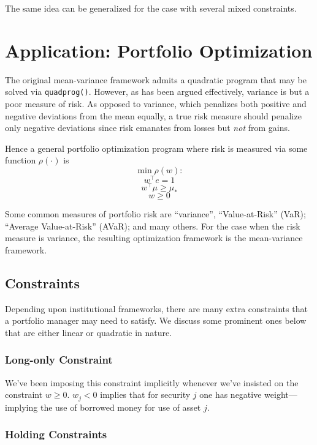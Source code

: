 \documentclass[11pt,]{article}
\begin{document}
The same idea can be generalized for the case with several mixed
constraints.

\section{Application: Portfolio
Optimization}\label{application-portfolio-optimization}

The original mean-variance framework admits a quadratic program that may
be solved via \texttt{quadprog()}. However, as has been argued
effectively, variance is but a poor measure of risk. As opposed to
variance, which penalizes both positive and negative deviations from the
mean equally, a true risk measure should penalize only negative
deviations since risk emanates from losses but \emph{not} from gains.

Hence a general portfolio optimization program where risk is measured
via some function \(\rho(\cdot)\) is \[\min{} \rho(w):\] \[w^{\top}e=1\]
\[w^{\top}\mu \geq \mu_*\] \[w\geq 0\]

Some common measures of portfolio risk are ``variance'',
``Value-at-Risk'' (VaR); ``Average Value-at-Risk'' (AVaR); and many
others. For the case when the risk measure is variance, the resulting
optimization framework is the mean-variance framework.

\subsection{Constraints}\label{constraints}

Depending upon institutional frameworks, there are many extra
constraints that a portfolio manager may need to satisfy. We discuss
some prominent ones below that are either linear or quadratic in nature.

\subsubsection{Long-only Constraint}\label{long-only-constraint}

We've been imposing this constraint implicitly whenever we've insisted
on the constraint \(w\geq 0\). \(w_j<0\) implies that for security \(j\)
one has negative weight---implying the use of borrowed money for use of
asset \(j\).

\subsubsection{Holding Constraints}\label{holding-constraints}
\end{document}

